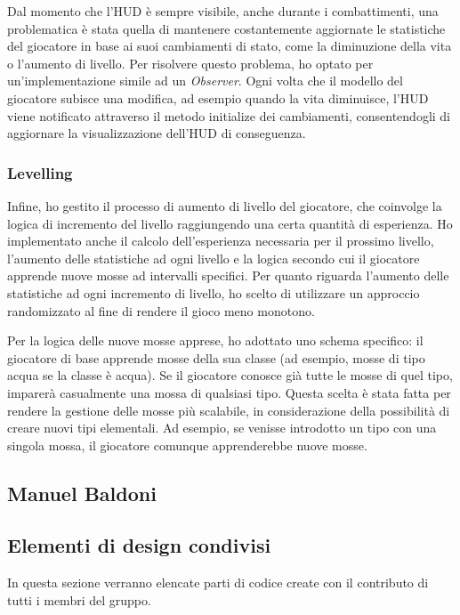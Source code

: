 \documentclass[a4paper,12pt]{report}
\begin{document}
Dal momento che l'HUD è sempre visibile, anche durante i combattimenti, una problematica è stata quella di mantenere costantemente aggiornate le statistiche del giocatore in base ai suoi cambiamenti di stato, come la diminuzione della vita o l'aumento di livello. Per risolvere questo problema, ho optato per un'implementazione simile ad un \textit{Observer}. Ogni volta che il modello del giocatore subisce una modifica, ad esempio quando la vita diminuisce, l'HUD viene notificato attraverso il metodo initialize dei cambiamenti, consentendogli di aggiornare la visualizzazione dell'HUD di conseguenza.
\subsubsection{Levelling}
Infine, ho gestito il processo di aumento di livello del giocatore, che coinvolge la logica di incremento del livello raggiungendo una certa quantità di esperienza. Ho implementato anche il calcolo dell'esperienza necessaria per il prossimo livello, l'aumento delle statistiche ad ogni livello e la logica secondo cui il giocatore apprende nuove mosse ad intervalli specifici.
Per quanto riguarda l'aumento delle statistiche ad ogni incremento di livello, ho scelto di utilizzare un approccio randomizzato al fine di rendere il gioco meno monotono.

Per la logica delle nuove mosse apprese, ho adottato uno schema specifico: il giocatore di base apprende mosse della sua classe (ad esempio, mosse di tipo acqua se la classe è acqua). Se il giocatore conosce già tutte le mosse di quel tipo, imparerà casualmente una mossa di qualsiasi tipo. Questa scelta è stata fatta per rendere la gestione delle mosse più scalabile, in considerazione della possibilità di creare nuovi tipi elementali. Ad esempio, se venisse introdotto un tipo con una singola mossa, il giocatore comunque apprenderebbe nuove mosse.

\subsection{Manuel Baldoni}

\subsection{Elementi di design condivisi}
In questa sezione verranno elencate parti di codice create con il contributo di tutti i membri del gruppo.
\end{document}
